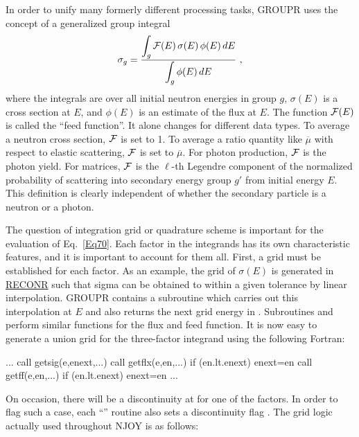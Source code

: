 In order to unify many formerly different processing tasks, GROUPR uses
the concept of a generalized group integral
  \begin{equation}
    \sigma_g={\displaystyle{\int_g {\cal F}(E)\,\sigma(E)\,\phi(E)\,dE}
    \over\displaystyle{\int_g\phi(E)\,dE}}\,\,,
  \label{Eq70}
  \end{equation}
where the integrals are over all initial neutron energies in group $g$,
$\sigma(E)$ is a cross section at $E$, and $\phi(E)$ is an estimate of
the flux at $E$.  The function ${\cal F}(E)$ is called the ``feed function''.
It alone changes for different data types.  To average a neutron cross
section, ${\cal F}$ is set to 1.  To average a ratio quantity like
$\overline \mu$ with respect to elastic scattering, ${\cal F}$ is set
to $\overline \mu$.  For photon production, ${\cal F}$ is the photon yield.
For matrices, ${\cal F}$ is the  $\ell$-th Legendre component of
the normalized probability of scattering into secondary energy group
$g'$ from initial energy $E$.  This definition is clearly independent of
whether the secondary particle is a neutron or a photon.

The question of integration grid or quadrature scheme is important for
the evaluation of Eq.~\ref{Eq70}.  Each factor in the integrands has its
own characteristic features, and it is important to account for them all.
First, a grid must be established for each factor.  As an example, the
grid of $\sigma(E)$ is generated in
\hyperlink{sRECONRhy}{RECONR} such
that sigma can be obtained to within a given tolerance by
linear interpolation.  GROUPR contains a subroutine
 which carries out this
interpolation at $E$ and also returns the next grid energy in
.  Subroutines 
and  perform similar functions
for the flux and feed function.  It is now easy to generate a
union grid for the three-factor integrand using the following Fortran:

\small
\begin{ccode}
       ...
      call getsig(e,enext,...)
      call getflx(e,en,...)
      if (en.lt.enext) enext=en
      call getff(e,en,...)
      if (en.lt.enext) enext=en
       ...
\end{ccode}
\normalsize

\noindent
On occasion, there will be a discontinuity at  for one of the
factors.  In order to flag such a case, each ``'' routine
also sets a discontinuity flag .  The grid logic actually
used throughout NJOY is as follows:


